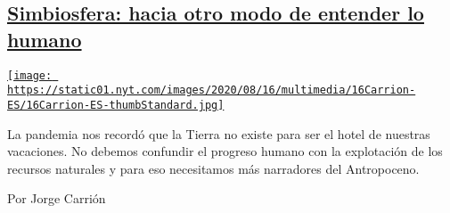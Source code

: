\begin{enumerate}
\begin{enumerate}
    \hypertarget{simbiosfera-hacia-otro-modo-de-entender-lo-humano}{%
    \subsection{\texorpdfstring{\href{/es/2020/08/16/espanol/opinion/coronavirus-arte.html}{Simbiosfera:
    hacia otro modo de entender lo
    humano}}{Simbiosfera: hacia otro modo de entender lo humano}}\label{simbiosfera-hacia-otro-modo-de-entender-lo-humano}}

    \href{/es/2020/08/16/espanol/opinion/coronavirus-arte.html}{\texttt{[image: https://static01.nyt.com/images/2020/08/16/multimedia/16Carrion-ES/16Carrion-ES-thumbStandard.jpg]}}

    La pandemia nos recordó que la Tierra no existe para ser el hotel de
    nuestras vacaciones. No debemos confundir el progreso humano con la
    explotación de los recursos naturales y para eso necesitamos más
    narradores del Antropoceno.

    Por Jorge Carrión
  \end{enumerate}
\end{enumerate}


